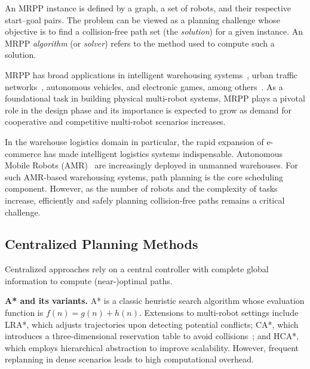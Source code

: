 \documentclass[conference]{IEEEtran}
\begin{document}
An MRPP instance is defined by a graph, a set of robots, and their
respective start–goal pairs.
The problem can be viewed as a planning challenge whose objective
is to find a collision-free path set (the \emph{solution}) for a
given instance.
An MRPP \emph{algorithm} (or \emph{solver}) refers to the method
used to compute such a solution.

MRPP has broad applications in intelligent warehousing
systems~\cite{zhang2023warehouse}, urban traffic
networks~\cite{dresner2008multiagent}, autonomous
vehicles, and electronic games, among
others~\cite{ma2022graph}.
As a foundational task in building physical multi-robot systems,
MRPP plays a pivotal role in the design phase and its importance
is expected to grow as demand for cooperative and competitive
multi-robot scenarios increases.


In the warehouse logistics domain in particular, the rapid
expansion of e-commerce has made intelligent logistics systems
indispensable.
Autonomous Mobile Robots (AMR)~\cite{tamura2025human} are
increasingly deployed in unmanned warehouses.
For such AMR-based warehousing systems, path planning is the core
scheduling component.
However, as the number of robots and the complexity of tasks
increase, efficiently and safely planning collision-free paths
remains a critical challenge.

\subsection{Centralized Planning Methods}

Centralized approaches rely on a central controller with
complete global information to compute (near-)optimal paths.

\textbf{A* and its variants.}
A* is a classic heuristic search algorithm whose evaluation
function is $f(n)=g(n)+h(n)$.
Extensions to multi-robot settings include LRA*, which adjusts
trajectories upon detecting potential conflicts; CA*, which
introduces a three-dimensional reservation table to avoid
collisions~\cite{silver2005cooperative}; and HCA*, which
employs hierarchical abstraction to improve scalability.
However, frequent replanning in dense scenarios leads to
high computational overhead.
\end{document}
